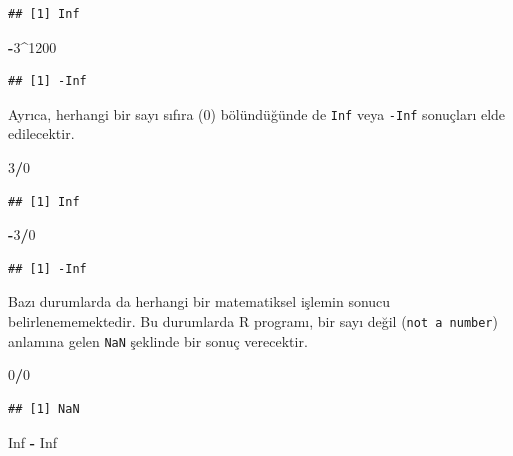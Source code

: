 \documentclass[
]{book}
\newenvironment{Shaded}{\begin{snugshade}}{\end{snugshade}}
\newcommand{\ConstantTok}[1]{\textcolor[rgb]{0.56,0.35,0.01}{#1}}
\newcommand{\DecValTok}[1]{\textcolor[rgb]{0.00,0.00,0.81}{#1}}
\newcommand{\SpecialCharTok}[1]{\textcolor[rgb]{0.81,0.36,0.00}{\textbf{#1}}}
\begin{document}
\begin{verbatim}
## [1] Inf
\end{verbatim}

\begin{Shaded}
\begin{Highlighting}[]
\SpecialCharTok{{-}}\DecValTok{3}\SpecialCharTok{\^{}}\DecValTok{1200}
\end{Highlighting}
\end{Shaded}

\begin{verbatim}
## [1] -Inf
\end{verbatim}

Ayrıca, herhangi bir sayı sıfıra (0) bölündüğünde de \texttt{Inf} veya \texttt{-Inf} sonuçları elde edilecektir.

\begin{Shaded}
\begin{Highlighting}[]
\DecValTok{3}\SpecialCharTok{/}\DecValTok{0}
\end{Highlighting}
\end{Shaded}

\begin{verbatim}
## [1] Inf
\end{verbatim}

\begin{Shaded}
\begin{Highlighting}[]
\SpecialCharTok{{-}}\DecValTok{3}\SpecialCharTok{/}\DecValTok{0}
\end{Highlighting}
\end{Shaded}

\begin{verbatim}
## [1] -Inf
\end{verbatim}

Bazı durumlarda da herhangi bir matematiksel işlemin sonucu belirlenememektedir. Bu durumlarda R programı, bir sayı değil (\texttt{not\ a\ number}) anlamına gelen \texttt{NaN} şeklinde bir sonuç verecektir.

\begin{Shaded}
\begin{Highlighting}[]
\DecValTok{0}\SpecialCharTok{/}\DecValTok{0}
\end{Highlighting}
\end{Shaded}

\begin{verbatim}
## [1] NaN
\end{verbatim}

\begin{Shaded}
\begin{Highlighting}[]
\ConstantTok{Inf} \SpecialCharTok{{-}} \ConstantTok{Inf}
\end{Highlighting}
\end{Shaded}
\end{document}
